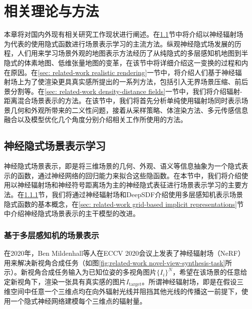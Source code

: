 \chapter{相关理论与方法}
\label{chapter:related-work}
本章将对国内外现有相关研究工作现状进行阐述。在\ref{sec: related-work implicit scene representation learning}节中将介绍以神经辐射场\cite{mildenhall_nerf_2020}为代表的使用隐式函数进行场景表示学习的主流方法。纵观神经隐式场发展的历程，人们用来学习场景外观的地图表示方法经历了从纯隐式的多层感知机地图到半隐式的体素地图、低维张量地图的变革，在该节中将详细介绍这一变换的过程和内在原因。在\ref{sec: related-work realistic rendering}一节中，将介绍人们基于神经辐射场上为了使渲染更具真实感所提出的一系列方法，包括引入无界场景压缩、前后景分割等。在\ref{sec: related-work density-distance fields}一节中，我们将介绍辐射-距离混合场景表示的方法。在该节中，我们将首先分析单纯使用辐射场同时表示场景几何和外观所带来的二义性问题，接着从采样策略、体渲染方法、多元传感信息融合以及模型优化几个角度分别介绍相关工作所使用的方法。

\section{神经隐式场景表示学习}
\label{sec: related-work implicit scene representation learning}

神经隐式场景表示，即是将三维场景的几何、外观、语义等信息抽象为一个隐式表示的函数，通过神经网络的回归能力来拟合这些隐函数。在本节中，我们将介绍使用以神经辐射场和神经符号距离场为主的神经隐式表征进行场景表示学习的主要方法。在\ref{sec: related-work MLP-based neural implicit representations}节，我们将通过神经辐射场和DeepSDF介绍使用多层感知机表示场景隐式函数的基本概念，在\ref{sec: related-work grid-based implicit representations}节中介绍神经隐式场景表示的主干模型的改进。


\subsection{基于多层感知机的场景表示}
\label{sec: related-work MLP-based neural implicit representations}

在2020年，Ben Mildenhall等人在ECCV 2020会议上发表了神经辐射场\cite{mildenhall_nerf_2020}（NeRF）用来解决新视角合成任务（如图\ref{fig:related-work novel-view-synthesis-task}所示）。新视角合成任务输入为已知位姿的多视角图片$\{{I}_i\}^N$，希望在该场景的任意给定新视角下，渲染一张具有真实感的图片${I}_\text{target}$。所谓神经辐射场，即是在假设三维空间中任意一个三维点均在向外辐射光线并阻挡其他光线的传播这一前提下，使用一个隐式神经网络建模每个三维点的辐射量。

